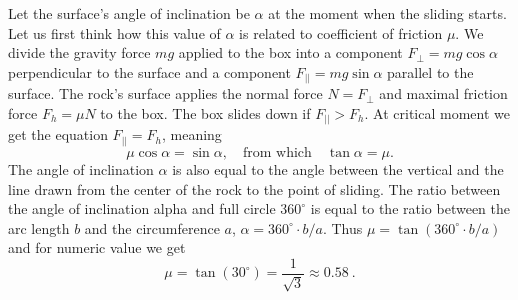 {\ifEngSolution
Let the surface’s angle of inclination be $\alpha$ at the moment when the sliding starts. Let us first think how this value of $\alpha$ is related to coefficient of friction $\mu$. We divide the gravity force $mg$ applied to the box into a component $F_{\bot}=mg\cos\alpha$ perpendicular to the surface and a component $F_{||}=mg\sin\alpha$ parallel to the surface. The rock’s surface applies the normal force $N=F_\bot$ and maximal friction force $F_h=\mu N$ to the box. The box slides down if $F_{||}>F_h$. At critical moment we get the equation $F_{||}=F_h$, meaning
\[ \mu \cos \alpha = \sin\alpha, \quad \text{from which} \quad \tan\alpha = \mu.\]
The angle of inclination $\alpha$ is also equal to the angle between the vertical and the line drawn from the center of the rock to the point of sliding. The ratio between the angle of inclination alpha and full circle $360^\circ$ is equal to the ratio between the arc length $b$ and the circumference $a$, $\alpha = 360^\circ \!\cdot\! b/a$. Thus $\mu = \tan (360^\circ \! \cdot\! b/a)$ and for numeric value we get 
\[\mu = \tan (30^\circ) = \frac{1}{\sqrt{3}} \approx \SI{0,58}{}.\]
\fi
}